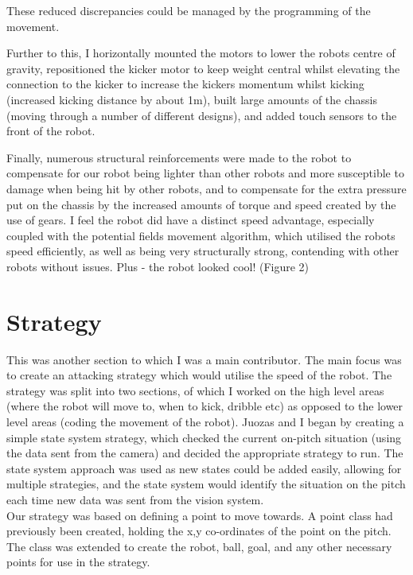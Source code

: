 \documentclass[12pt]{IEEEtran}
\begin{document}
These reduced discrepancies could be managed by the programming of the movement. \linebreak

Further to this, I horizontally mounted the motors to lower the robots centre of gravity, repositioned the kicker motor to keep weight central whilst elevating the connection to the kicker to increase the kickers momentum whilst kicking (increased kicking distance by about 1m), built large amounts of the chassis (moving through a number of different designs), and added touch sensors to the front of the robot. \linebreak

Finally, numerous structural reinforcements were made to the robot to compensate for our robot being lighter than other robots and more susceptible to damage when being hit by other robots, and to compensate for the extra pressure put on the chassis by the increased amounts of torque and speed created by the use of gears. I feel the robot did have a distinct speed advantage, especially coupled with the potential fields movement algorithm, which utilised the robots speed efficiently, as well as being very structurally strong, contending with other robots without issues. Plus - the robot looked cool! (Figure 2)

\section{Strategy}

This was another section to which I was a main contributor. The main focus was to create an attacking strategy which would utilise the speed of the robot. The strategy was split into two sections, of which I worked on the high level areas (where the robot will move to, when to kick, dribble etc) as opposed to the lower level areas (coding the movement of the robot). Juozas and I began by creating a simple state system strategy, which checked the current on-pitch situation (using the data sent from the camera) and decided the appropriate strategy to run. The state system approach was used as new states could be added easily, allowing for multiple strategies, and the state system would identify the situation on the pitch each time new data was sent from the vision system. \\

Our strategy was based on defining a point to move towards. A point class had previously been created, holding the x,y co-ordinates of the point on the pitch. The class was extended to create the robot, ball, goal, and any other necessary points for use in the strategy. 
\end{document}
